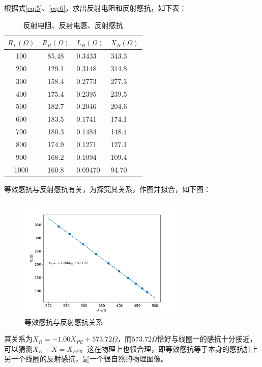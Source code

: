 \documentclass[12pt]{article}
\begin{document}
根据式\ref{eq:5}、\ref{eq:6}，求出反射电阻和反射感抗，如下表：
\begin{table}[H]
    \centering
    \begin{tabular}{|c|c|l|l|}
    \hline
    \multicolumn{1}{|l|}{$R_L(\Omega)$} & \multicolumn{1}{l|}{$R_{R}(\Omega)$} & $L_{R}(\Omega)$ & $X_{R}(\Omega)$ \\ \hline
    100  & 85.48 & 0.3433  & 343.3 \\ \hline
    200  & 129.1 & 0.3148  & 314.8 \\ \hline
    300  & 158.4 & 0.2773  & 277.3 \\ \hline
    400  & 175.4 & 0.2395  & 239.5 \\ \hline
    500  & 182.7 & 0.2046  & 204.6 \\ \hline
    600  & 183.5 & 0.1741  & 174.1 \\ \hline
    700  & 180.3 & 0.1484  & 148.4 \\ \hline
    800  & 174.9 & 0.1271  & 127.1 \\ \hline
    900  & 168.2 & 0.1094  & 109.4 \\ \hline
    1000 & 160.8 & 0.09470 & 94.70 \\ \hline
    \end{tabular}
    \caption{反射电阻、反射电感、反射感抗}
    \label{tab:4}
\end{table}
等效感抗与反射感抗有关，为探究其关系，作图并拟合，如下图：
\begin{figure}[H]
    \centering
    \includegraphics[width=0.7\textwidth]{fig_opt2.pdf}
    \caption{等效感抗与反射感抗关系}
    \label{fig:3}
\end{figure}
其关系为$X_R = -1.00X_{PE}+573.72\Omega$，而$573.72\Omega$恰好与线圈一的感抗十分接近，可以猜测$X_R + X = X_{PE}$。这在物理上也很合理，即等效感抗等于本身的感抗加上另一个线圈的反射感抗，是一个很自然的物理图像。
\end{document}

